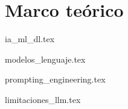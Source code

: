 \chapter{Marco teórico}


{ia_ml_dl.tex}

{modelos_lenguaje.tex}

{prompting_engineering.tex}

{limitaciones_llm.tex}







